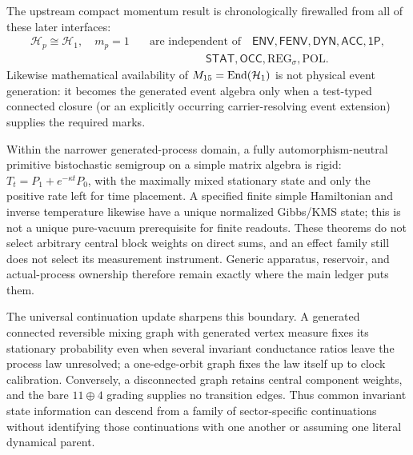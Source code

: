 \documentclass[12pt,a4paper]{article}
\begin{document}
The upstream compact momentum result is chronologically firewalled from all
of these later interfaces:
\[
\begin{aligned}
\mathcal H_p\cong\mathcal H_1,\quad m_p=1
&\quad\text{are independent of}\quad
\mathsf{ENV},\mathsf{FENV},\mathsf{DYN},\mathsf{ACC},\mathsf{1P},\\
&\hspace{6em}\mathsf{STAT},\mathsf{OCC},\mathrm{REG}_\sigma,\mathrm{POL}.
\end{aligned}
\]
Likewise mathematical availability of \(M_{15}=\operatorname{End}(\mathcal H_1)\) is not
physical event generation: it becomes the generated event algebra only when a
test-typed connected closure (or an explicitly occurring carrier-resolving
event extension) supplies the required marks.

Within the narrower generated-process domain, a fully automorphism-neutral
primitive bistochastic semigroup on a simple matrix algebra is rigid:
\(T_t=P_1+e^{-\kappa t}P_0\), with the maximally mixed stationary state and
only the positive rate left for time placement.  A specified finite simple
Hamiltonian and inverse temperature likewise have a unique normalized
Gibbs/KMS state; this is not a unique pure-vacuum prerequisite for finite
readouts. These theorems do not select arbitrary central block weights on
direct sums, and an effect family still does not select its measurement
instrument.  Generic apparatus, reservoir, and
actual-process ownership therefore remain exactly where the main ledger puts
them.

The universal continuation update sharpens this boundary.  A generated
connected reversible mixing graph with generated vertex measure fixes its
stationary probability even when several invariant conductance ratios leave
the process law unresolved; a one-edge-orbit graph fixes the law itself up to
clock calibration.  Conversely, a disconnected graph retains central
component weights, and the bare \(11\oplus4\) grading supplies no transition
edges.  Thus common invariant state information can descend from a family of
sector-specific continuations without identifying those continuations with
one another or assuming one literal dynamical parent.



\end{document}
